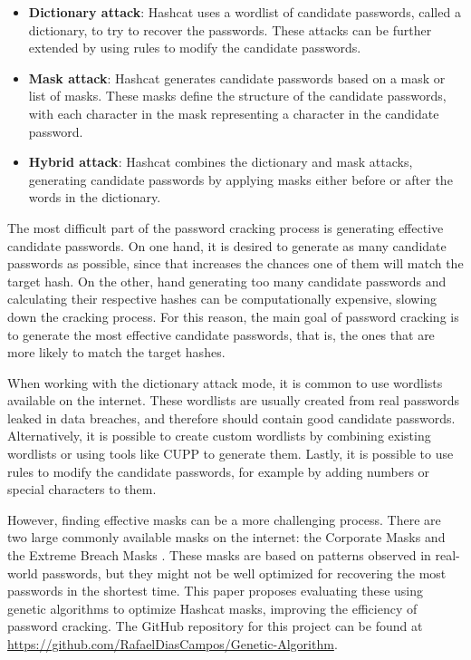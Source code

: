 \documentclass[sigconf,authordraft]{acmart}
\begin{document}
\begin{itemize}
  \item \textbf{Dictionary attack}: Hashcat uses a wordlist of candidate passwords, called a dictionary, to try to recover the passwords.
These attacks can be further extended by using rules to modify the candidate passwords.

  \item \textbf{Mask attack}: Hashcat generates candidate passwords based on a mask or list of masks.
These masks define the structure of the candidate passwords, with each character in the mask representing a character in the candidate password.

  \item \textbf{Hybrid attack}: Hashcat combines the dictionary and mask attacks, generating candidate passwords by applying masks either before or after the words in the dictionary.
\end{itemize}

The most difficult part of the password cracking process is generating effective candidate passwords.
On one hand, it is desired to generate as many candidate passwords as possible, since that increases the chances one of them will match the target hash.
On the other, hand generating too many candidate passwords and calculating their respective hashes can be computationally expensive, slowing down the cracking process.
For this reason, the main goal of password cracking is to generate the most effective candidate passwords, that is, the ones that are more likely to match the target hashes.

When working with the dictionary attack mode, it is common to use wordlists available on the internet.
These wordlists are usually created from real passwords leaked in data breaches, and therefore should contain good candidate passwords.
Alternatively, it is possible to create custom wordlists by combining existing wordlists or using tools like CUPP \cite{cupp} to generate them.
Lastly, it is possible to use rules to modify the candidate passwords, for example by adding numbers or special characters to them.

However, finding effective masks can be a more challenging process.
There are two large commonly available masks on the internet: the Corporate Masks \cite{corporate_masks} and the Extreme Breach Masks \cite{extreme_breach_masks}.
These masks are based on patterns observed in real-world passwords, but they might not be well optimized for recovering the most passwords in the shortest time.
This paper proposes evaluating these using genetic algorithms to optimize Hashcat masks, improving the efficiency of password cracking.
The GitHub repository for this project can be found at \url{https://github.com/RafaelDiasCampos/Genetic-Algorithm}.
\end{document}
